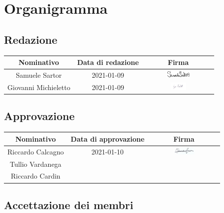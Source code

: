 \section{Organigramma}

\subsection{Redazione}

\begin{center}
	\begin{longtable}{| c | c | c |}
		\hline
		\rowcolor[HTML]{F9CB9C} 
		\textbf{Nominativo} & \textbf{Data di redazione} & \textbf{Firma}  \\ \hline
		  Samuele Sartor &  2021-01-09  &
		  	\includegraphics[width=3.5cm, height=0.4cm]{./res/images/SSfirma.jpg}
		  \\ \hline
		  Giovanni Michieletto &  2021-01-09  &  
		  	\includegraphics[width=3.5cm, height=0.4cm]{./res/images/GMfirma.jpg}
		  \\ \hline
	\end{longtable}
\end{center}

\subsection{Approvazione}

\begin{center}
	\begin{longtable}{| c | c | c |}
		\hline
		\rowcolor[HTML]{F9CB9C} 
		\textbf{Nominativo} & \textbf{Data di approvazione} & \textbf{Firma}  \\ \hline
		Riccardo Calcagno &  2021-01-10  &  
			\includegraphics[width=3.5cm, height=0.4cm]{./res/images/RCfirma.jpg}
	    \\ \hline
		Tullio Vardanega &    &   \\ \hline
		Riccardo Cardin &    &   \\ \hline
	\end{longtable}
\end{center}

\subsection{Accettazione dei membri}

